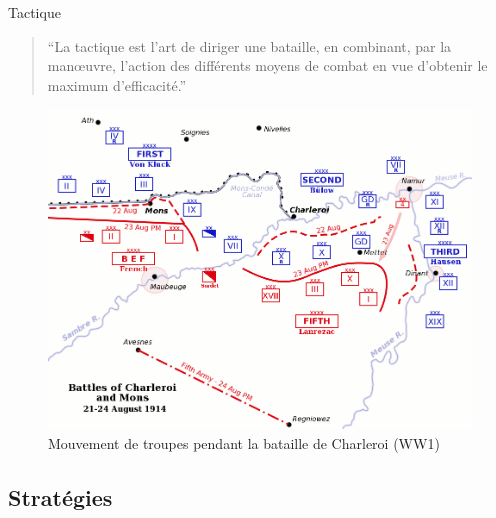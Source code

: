 \documentclass{article}
\begin{document}
Tactique \cite{tactic}
\begin{quote}“La tactique est l'art de diriger une bataille, en combinant, par la manœuvre, l'action des différents moyens de combat en vue d'obtenir le maximum d'efficacité.”\end{quote}
\begin{figure}[H]
	\begin{centering}
	\includegraphics[width=\linewidth]{../ressources/Battles_of_Charleroi_ww1}
	\caption{Mouvement de troupes pendant la bataille de Charleroi (WW1) \cite{charleroi_battle}}
	\end{centering}
\end{figure}



\subsection{Stratégies}
\end{document}
